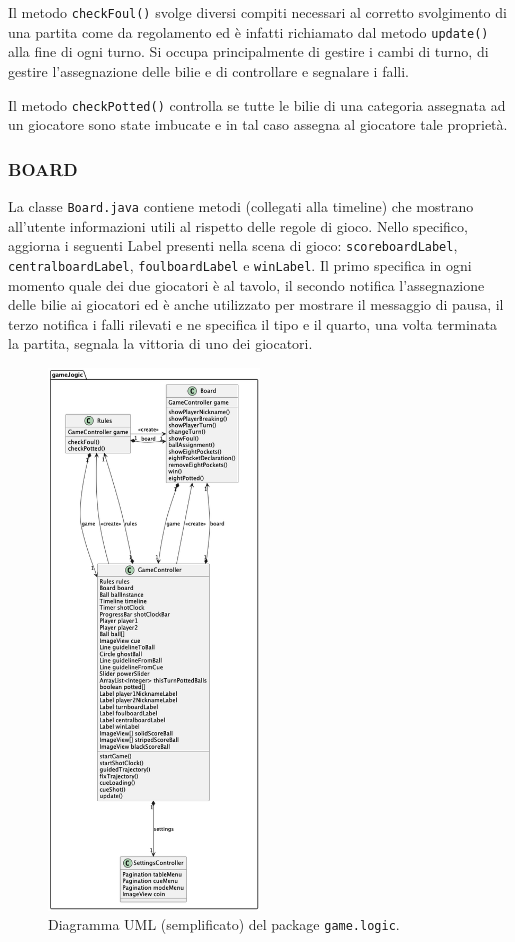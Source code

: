 \documentclass[12pt,a4paper]{report}
\begin{document}
Il metodo \texttt{checkFoul()} svolge diversi compiti necessari al corretto svolgimento di una partita come da regolamento ed è infatti richiamato dal metodo \texttt{update()} alla fine di ogni turno.
Si occupa principalmente di gestire i cambi di turno, di gestire l'assegnazione delle bilie e di controllare e segnalare i falli.

\vspace{3mm}

Il metodo \texttt{checkPotted()} controlla se tutte le bilie di una categoria assegnata ad un giocatore sono state imbucate e in tal caso assegna al giocatore tale proprietà.

\subsubsection*{BOARD}
La classe \texttt{Board.java} contiene metodi (collegati alla timeline) che mostrano all'utente informazioni utili al rispetto delle regole di gioco.
Nello specifico, aggiorna i seguenti Label presenti nella scena di gioco: \texttt{scoreboardLabel}, \texttt{centralboardLabel}, \texttt{foulboardLabel} e \texttt{winLabel}.
Il primo specifica in ogni momento quale dei due giocatori è al tavolo, il secondo notifica l'assegnazione delle bilie ai giocatori ed è anche utilizzato per mostrare il messaggio di pausa, il terzo notifica i falli rilevati e ne specifica il tipo e il quarto, una volta terminata la partita, segnala la vittoria di uno dei giocatori.

\begin{figure}
	\center
	\includegraphics[width=0.5\textwidth]{logic.png}
	\caption{Diagramma UML (semplificato) del package \texttt{game.logic}.}
\end{figure}
\end{document}
